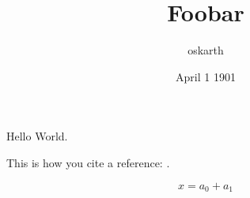 \documentclass[12pt]{article}
\title{Foobar}
\author{oskarth}
\date{April 1 1901}
\begin{document}
\maketitle

Hello World.

This is how you cite a reference: \cite{goossens93}.

\begin{equation}
x=a_0 + a_1
\end{equation}


\end{document}
